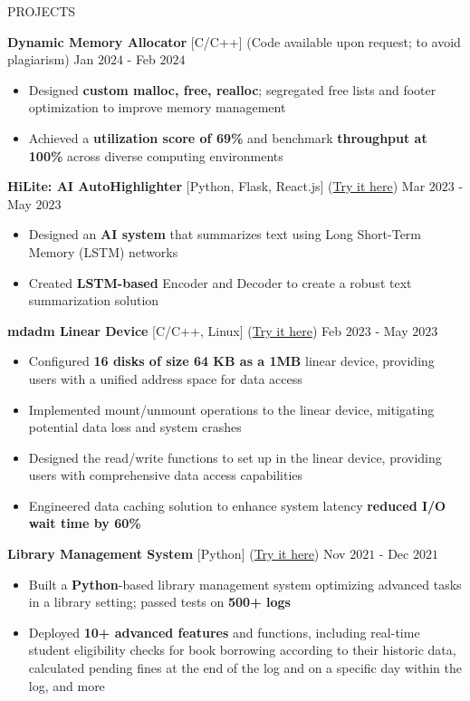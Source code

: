 \documentclass{resume} %
\begin{document}
\begin{rSection}{PROJECTS}

{\bf Dynamic Memory Allocator }{[C/C++] }{(Code available upon request; to avoid plagiarism)} \hfill Jan $2024$ - Feb $2024$
\begin{itemize}[itemsep = -4pt]
    \item Designed {\bf custom malloc, free, realloc}; segregated free lists and footer optimization to improve memory management
    \item Achieved a {\bf utilization score of 69\%} and benchmark {\bf throughput at 100\%} across diverse computing environments
\end{itemize}

{\bf HiLite: AI AutoHighlighter }{[Python, Flask, React.js] }{(\href{https://github.com/harshitjain17/HiLite-AIAutoHighlighter}{Try it here})} \hfill Mar $2023$ - May $2023$
\begin{itemize}[itemsep = -4pt]
    \item Designed an {\bf AI system} that summarizes text using Long Short-Term Memory (LSTM) networks
    \item Created {\bf LSTM-based} Encoder and Decoder to create a robust text summarization solution
\end{itemize}

{\bf mdadm Linear Device }{[C/C++, Linux] }{(\href{https://github.com/harshitjain17/mdadm-Linear-Device}{Try it here})} \hfill Feb $2023$ - May $2023$
\begin{itemize}[itemsep = -4pt]
    \item Configured {\bf 16 disks of size 64 KB as a 1MB} linear device, providing users with a unified address space for data access
    \item Implemented mount/unmount operations to the linear device, mitigating potential data loss and system crashes
    \item Designed the read/write functions to set up in the linear device, providing users with comprehensive data access capabilities
    \item Engineered data caching solution to enhance system latency {\bf reduced I/O wait time by 60\%}
\end{itemize}

{\bf Library Management System }{[Python] }{(\href{https://github.com/harshitjain17/Library-Management-System}{Try it here})} \hfill Nov $2021$ - Dec $2021$
\begin{itemize}[itemsep = -4pt]
    \item Built a {\bf Python}-based library management system optimizing advanced tasks in a library setting; passed tests on {\bf 500+ logs}
    \item Deployed {\bf 10+ advanced features} and functions, including real-time student eligibility checks for book borrowing according to their historic data, calculated pending fines at the end of the log and on a specific day within the log, and more
\end{itemize}

\end{rSection}
\end{document}
